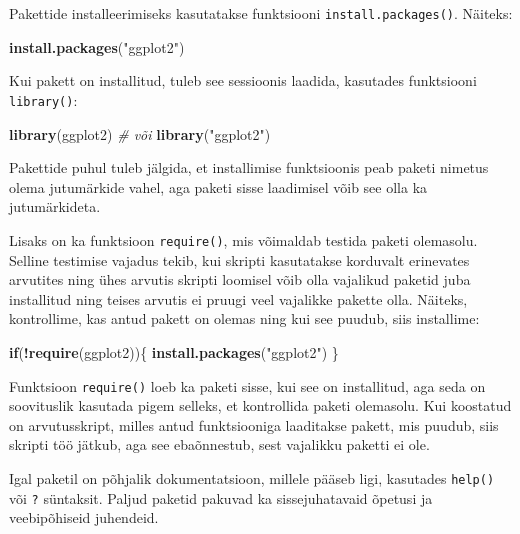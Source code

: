 \documentclass[
]{book}
\newenvironment{Shaded}{\begin{snugshade}}{\end{snugshade}}
\newcommand{\CommentTok}[1]{\textcolor[rgb]{0.56,0.35,0.01}{\textit{#1}}}
\newcommand{\ControlFlowTok}[1]{\textcolor[rgb]{0.13,0.29,0.53}{\textbf{#1}}}
\newcommand{\FunctionTok}[1]{\textcolor[rgb]{0.13,0.29,0.53}{\textbf{#1}}}
\newcommand{\NormalTok}[1]{#1}
\newcommand{\SpecialCharTok}[1]{\textcolor[rgb]{0.81,0.36,0.00}{\textbf{#1}}}
\newcommand{\StringTok}[1]{\textcolor[rgb]{0.31,0.60,0.02}{#1}}
\renewenvironment{Shaded} {\begin{snugshade}\footnotesize} {\end{snugshade}}
\begin{document}
Pakettide installeerimiseks kasutatakse funktsiooni \texttt{install.packages()}. Näiteks:

\begin{Shaded}
\begin{Highlighting}[]
\FunctionTok{install.packages}\NormalTok{(}\StringTok{"ggplot2"}\NormalTok{)}
\end{Highlighting}
\end{Shaded}

Kui pakett on installitud, tuleb see sessioonis laadida, kasutades funktsiooni \texttt{library()}:

\begin{Shaded}
\begin{Highlighting}[]
\FunctionTok{library}\NormalTok{(ggplot2) }
\CommentTok{\# või}
\FunctionTok{library}\NormalTok{(}\StringTok{"ggplot2"}\NormalTok{)}
\end{Highlighting}
\end{Shaded}

Pakettide puhul tuleb jälgida, et installimise funktsioonis peab paketi nimetus olema jutumärkide vahel, aga paketi sisse laadimisel võib see olla ka jutumärkideta.

Lisaks on ka funktsioon \texttt{require()}, mis võimaldab testida paketi olemasolu. Selline testimise vajadus tekib, kui skripti kasutatakse korduvalt erinevates arvutites ning ühes arvutis skripti loomisel võib olla vajalikud paketid juba installitud ning teises arvutis ei pruugi veel vajalikke pakette olla. Näiteks, kontrollime, kas antud pakett on olemas ning kui see puudub, siis installime:

\begin{Shaded}
\begin{Highlighting}[]
\ControlFlowTok{if}\NormalTok{(}\SpecialCharTok{!}\FunctionTok{require}\NormalTok{(ggplot2))\{}
    \FunctionTok{install.packages}\NormalTok{(}\StringTok{"ggplot2"}\NormalTok{)    }
\NormalTok{\}}
\end{Highlighting}
\end{Shaded}

Funktsioon \texttt{require()} loeb ka paketi sisse, kui see on installitud, aga seda on soovituslik kasutada pigem selleks, et kontrollida paketi olemasolu. Kui koostatud on arvutusskript, milles antud funktsiooniga laaditakse pakett, mis puudub, siis skripti töö jätkub, aga see ebaõnnestub, sest vajalikku paketti ei ole.

Igal paketil on põhjalik dokumentatsioon, millele pääseb ligi, kasutades \texttt{help()} või \texttt{?} süntaksit. Paljud paketid pakuvad ka sissejuhatavaid õpetusi ja veebipõhiseid juhendeid.
\end{document}
